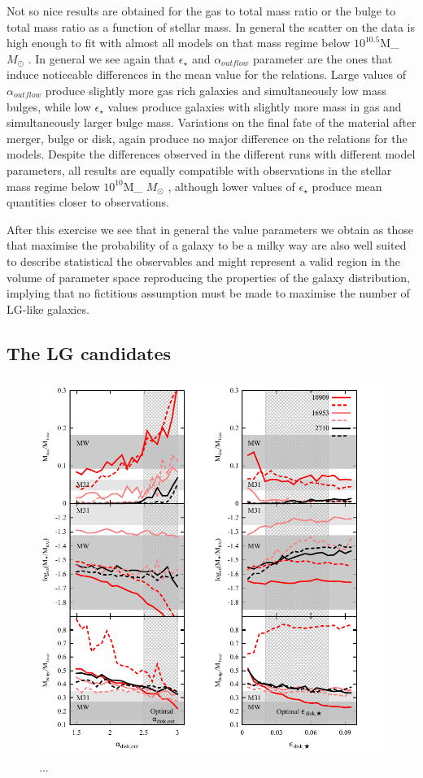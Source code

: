\documentclass[useAMS,usenatbib]{mn2e}
\def \Msun {\ifmmode M_{\odot} \else $M_{\odot}$ \fi}
\begin{document}
Not so nice results are obtained for the gas to total mass ratio or
the bulge to total mass ratio as a function of stellar mass. In
general the scatter on the data is high enough to fit with almost all
models on that mass regime below $10^{10.5}$\Msun. In general we see
again that $\epsilon_{\star}$ and $\alpha_{outflow}$ parameter are the
ones that induce noticeable differences in the mean value for the
relations. Large values of $\alpha_{outflow}$ produce slightly more
gas rich galaxies and simultaneously low mass bulges, while low
$\epsilon_{\star}$ values produce galaxies with slightly more mass in
gas and simultaneously larger bulge mass. Variations on the final
fate of the material after merger, bulge or disk, again produce no
major difference on the relations for the models. Despite the
differences observed in the different runs with different model
parameters, all results are equally compatible with observations in
the stellar mass regime below $10^{10}$\Msun, although lower values
of $\epsilon_{\star}$ produce mean quantities closer to observations.

After this exercise we see that in general the value parameters we
obtain as those that maximise the probability of a galaxy to be a
milky way are also well suited to describe statistical the observables
and might represent a valid region in the volume of parameter space
reproducing the properties of the galaxy distribution, implying that
no fictitious assumption must be made to maximise the number of
LG-like galaxies.

\subsection{The LG candidates}

\begin{figure}
 \includegraphics[scale=0.7,angle=0]{figures/LG/LG-props-params-multi-v2.pdf}
\caption{...}
\label{fig:runCands}
\end{figure}
\end{document}
